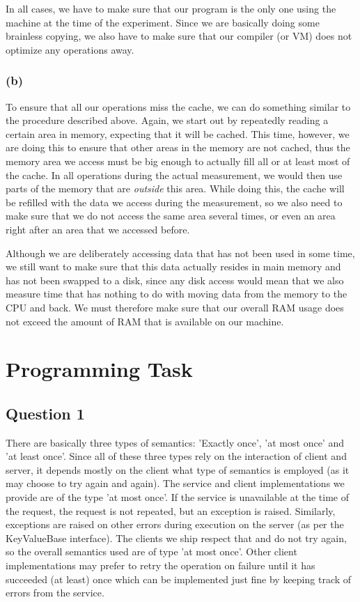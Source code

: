 \documentclass[12pt,a4paper]{article}
\begin{document}
In all cases, we have to make sure that our program is the only one using the machine at the time of the experiment. Since we are basically doing some brainless copying, we also have to make sure that our compiler (or VM) does not optimize any operations away.

\subsubsection*{(b)}
To ensure that all our operations miss the cache, we can do something similar to the procedure described above. Again, we start out by repeatedly reading a certain area in memory, expecting that it will be cached. This time, however, we are doing this to ensure that other areas in the memory are not cached, thus the memory area we access must be big enough to actually fill all or at least most of the cache. In all operations during the actual measurement, we would then use parts of the memory that are \emph{outside} this area. While doing this, the cache will be refilled with the data we access during the measurement, so we also need to make sure that we do not access the same area several times, or even an area right after an area that we accessed before.

Although we are deliberately accessing data that has not been used in some time, we still want to make sure that this data actually resides in main memory and has not been swapped to a disk, since any disk access would mean that we also measure time that has nothing to do with moving data from the memory to the CPU and back. We must therefore make sure that our overall RAM usage does not exceed the amount of RAM that is available on our machine.

\section*{Programming Task}
\label{sec:programming}

\subsection*{Question 1}
\label{sec:pq1}
There are basically three types of semantics: 'Exactly once', 'at most once' and 'at least once'. Since all of these three types rely on the interaction of client and server, it depends mostly on the client what type of semantics is employed (as it may choose to try again and again). The service and client implementations we provide are of the type 'at most once'. If the service is unavailable at the time of the request, the request is not repeated, but an exception is raised. Similarly, exceptions are raised on other errors during execution on the server (as per the KeyValueBase interface). The clients we ship respect that and do not try again, so the overall semantics used are of type 'at most once'. Other client implementations may prefer to retry the operation on failure until it has succeeded (at least) once which can be implemented just fine by keeping track of errors from the service.
\end{document}
